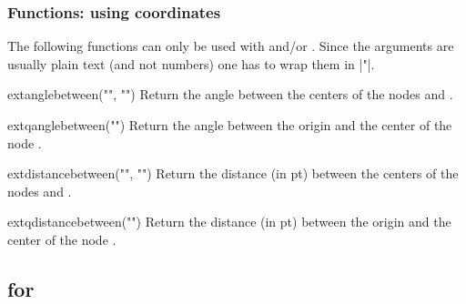 \begin{multicols}{2}
\subsubsection{Functions: using coordinates}
The following functions can only be used with \pgfname\space and/or \tikzname.
Since the arguments are usually plain text (and not numbers) one has to wrap
them in |"|.
\begin{math-function}{extanglebetween("", "")}\mathcommand
  Return the angle between the centers of the nodes  and .
\end{math-function}
\begin{math-function}{extqanglebetween("")}\mathcommand
  Return the angle between the origin and the center of the node .
\end{math-function}
\begin{math-function}{extdistancebetween("", "")}\mathcommand
  Return the distance (in pt) between the centers of the nodes  and .
\end{math-function}
\begin{math-function}{extqdistancebetween("")}\mathcommand
  Return the distance (in pt) between the origin and the center of the node .
\end{math-function}

\end{multicols}

\begin{codeexample}[width=6cm,preamble=\usetikzlibrary{calc,ext.misc,through}]
\end{codeexample}

\subsection{\pgfname for}

